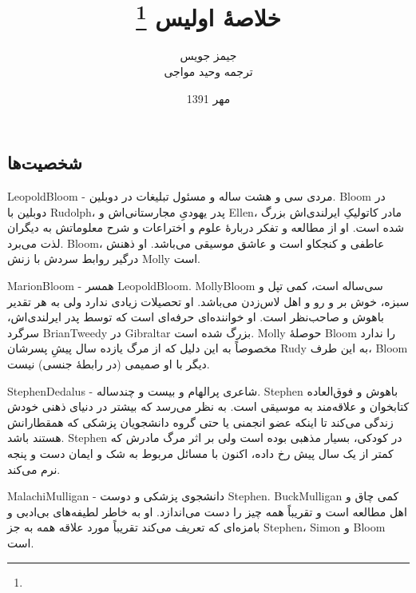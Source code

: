 \documentclass[12pt,onecolumn,a4paper]{book}
\begin{document}
    \title{خلاصۀ اولیس \footnote{}}
    \author{جیمز جویس\\
    ترجمه وحید مواجی
    }
    \date{مهر 1391}
    \frontmatter                            %
    \maketitle                              %
    \tableofcontents                        %
    \mainmatter


    \part{}
    \chapter{شخصیت‌ها}
    \gls{LeopoldBloom} - مردی سی و هشت ساله و مسئول تبلیغات در دوبلین. \gls{Bloom} در دوبلین با \gls{Rudolph}، پدر یهودیِ مجارستانی‌اش‌ و \gls{Ellen}، مادر کاتولیکِ ایرلندی‌اش بزرگ شده است. او از مطالعه و تفکر دربارۀ علوم و اختراعات و شرح معلوماتش به دیگران لذت می‌برد. \gls{Bloom}، عاطفی و کنجکاو است و عاشق موسیقی می‌باشد. او ذهنش درگیر روابط سردش با زنش \gls{Molly} است.

    \gls{MarionBloom} - همسر \gls{LeopoldBloom}. \gls{MollyBloom} سی‌ساله است، کمی تپل و سبزه، خوش بر و رو و اهل لاس‌زدن می‌باشد. او تحصیلات زیادی ندارد ولی به هر تقدیر باهوش و صاحب‌نظر است. او خواننده‌ای حرفه‌ای است که توسط پدر ایرلندی‌اش، سرگرد \gls{BrianTweedy} در \gls{Gibraltar} بزرگ شده است. \gls{Molly} حوصلۀ \gls{Bloom} را ندارد مخصوصاً به این دلیل که از مرگ یازده سال پیشِ پسرشان \gls{Rudy} به این طرف، \gls{Bloom} دیگر با او صمیمی (در رابطۀ جنسی) نیست.

    \gls{StephenDedalus} - شاعری پرالهام و بیست و چندساله. \gls{Stephen} باهوش و فوق‌العاده کتابخوان و علاقه‌مند به موسیقی است. به نظر می‌رسد که بیشتر در دنیای ذهنی خودش زندگی می‌کند تا اینکه عضو انجمنی یا حتی گروه دانشجویان پزشکی که همقطارانش هستند باشد. \gls{Stephen} در کودکی، بسیار مذهبی بوده است ولی بر اثر مرگ مادرش که کمتر از یک سال پیش رخ داده، اکنون با مسائل مربوط به شک و ایمان دست و پنجه نرم می‌کند.

    \gls{MalachiMulligan} - دانشجوی پزشکی و دوست \gls{Stephen}. \gls{BuckMulligan} کمی چاق و اهل مطالعه است و تقریباً همه چیز را دست می‌اندازد. او به خاطر لطیفه‌های بی‌ادبی و بامزه‌ای که تعریف می‌کند تقریباً مورد علاقه همه به جز \gls{Stephen}، \gls{Simon} و \gls{Bloom} است.
\end{document}
